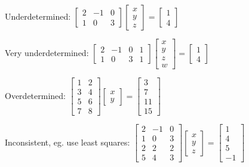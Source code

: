 \documentclass{article}
\begin{document}
Underdetermined: $\left[ 
\begin{array}{rrr}
2 & -1 & 0 \\ 
1 & 0 & 3%
\end{array}%
\right] \left[ 
\begin{array}{c}
x \\ 
y \\ 
z%
\end{array}%
\right] =\left[ 
\begin{array}{c}
1 \\ 
4%
\end{array}%
\right] $

Very underdetermined: $\left[ 
\begin{array}{rrrc}
2 & -1 & 0 & 1 \\ 
1 & 0 & 3 & 1%
\end{array}%
\right] \left[ 
\begin{array}{c}
x \\ 
y \\ 
z \\ 
w%
\end{array}%
\right] =\left[ 
\begin{array}{c}
1 \\ 
4%
\end{array}%
\right] $

Overdetermined: $\left[ 
\begin{array}{cc}
1 & 2 \\ 
3 & 4 \\ 
5 & 6 \\ 
7 & 8%
\end{array}%
\right] \left[ 
\begin{array}{c}
x \\ 
y%
\end{array}%
\right] =\left[ 
\begin{array}{r}
3 \\ 
7 \\ 
11 \\ 
15%
\end{array}%
\right] $

Inconsistent, eg. use least squares: $\left[ 
\begin{array}{rrr}
2 & -1 & 0 \\ 
1 & 0 & 3 \\ 
2 & 2 & 2 \\ 
5 & 4 & 3%
\end{array}%
\right] \left[ 
\begin{array}{c}
x \\ 
y \\ 
z%
\end{array}%
\right] =\left[ 
\begin{array}{c}
1 \\ 
4 \\ 
5 \\ 
-1%
\end{array}%
\right] $
\end{document}
